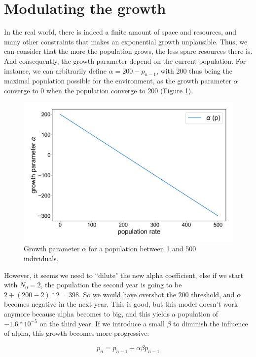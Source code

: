 \documentclass{article}
\begin{document}
 \section{Modulating the growth}

 In the real world, there is indeed a finite amount of space and resources, and many other constraints that makes an exponential growth unplausible. Thus, we can consider that the more the population grows, the less spare resources there is. And consequently, the growth parameter depend on the current population. For instance, we can arbitrarily define \textit{$\alpha = 200 - p_{n-1}$}, with 200 thus being the maximal population possible for the environment, as the growth parameter $\alpha$ converge to 0 when the population converge to 200 (Figure \ref{fig:paramalpha}).




\begin{figure}[!htb]
\centering
  \includegraphics[width=.7\linewidth]{fig1_report3.png}
  \caption[population parameter] {Growth parameter $\alpha$ for a population between 1 and 500 individuals.}\label{fig:paramalpha}
\end{figure}



However, it seems we need to ``dilute" the new alpha coefficient, else if we start with $N_0 = 2$, the population the second year is going to be $2 + (200 -2) * 2 = 398$. So we would have overshot the $200$ threshold, and $\alpha$ becomes negative in the next year. This is good, but this model doesn't work anymore because alpha becomes to big, and this yields a population of $-1.6 * 10^{-5}$ on the third year.
If we introduce a small $\beta$ to diminish the influence of alpha, this growth becomes more progressive:

\begin{equation}\label{beta2}
p_n = p_{n-1} + \alpha \beta p_{n-1}
\end{equation}
\end{document}
